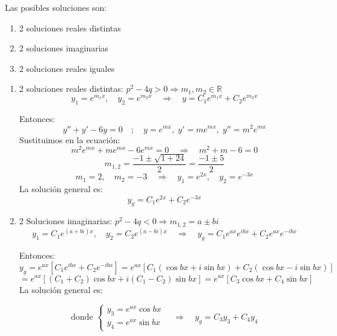 \documentclass[a4paper,12pt]{article}
\begin{document}
Las posibles soluciones son:

\begin{enumerate}[label=\textbf{\alph*)}]
    \item 2 soluciones reales distintas
    \item 2 soluciones imaginarias
    \item 2 soluciones reales iguales
\end{enumerate}

\begin{enumerate}[label=\textbf{\alph*)}]
\item 2 soluciones reales distintas: \quad \( p^2 - 4q > 0 \Rightarrow m_1, m_2 \in \mathbb{R} \)
\vspace{0,4 em}
\[
y_1 = e^{m_1 x}, \quad y_2 = e^{m_2 x}
\quad \Rightarrow \quad 
y = C_1 e^{m_1 x} + C_2 e^{m_2 x}
\]

Entonces:
\vspace{0,4 em}
\[
y'' + y' - 6y = 0 \quad ; \quad y = e^{mx}, \; y' = m e^{mx}, \; y'' = m^2 e^{mx}
\]
Sustituimos en la ecuación:
\vspace{0,4 em}
\[
m^2 e^{mx} + m e^{mx} - 6 e^{mx} = 0 
\quad \Rightarrow \quad 
m^2 + m - 6 = 0  
\]
\vspace{-0,2 em}
\[
m_{1,2} = \frac{-1 \pm \sqrt{1 + 24}}{2} = \frac{-1 \pm 5}{2}
\]
\vspace{-0,2 em}
\[
m_1 = 2, \quad m_2 = -3 
\quad \Rightarrow \quad 
y_1 = e^{2x}, \quad y_2 = e^{-3x}
\]
La solución general es:
\vspace{-0,2 em}
\[
y_g = C_1 e^{2x} + C_2 e^{-3x}
\]

\bigskip
\item 2 Soluciones imaginarias: \quad \( p^2 - 4q < 0 \Rightarrow m_{1,2} = a \pm bi \)
\vspace{0,4 em}
\[
y_1 = C_1 e^{(a + bi)x}, \quad y_2 = C_2 e^{(a - bi)x}
\quad \Rightarrow \quad 
y_g = C_1 e^{a x} e^{i b x} + C_2 e^{a x} e^{-i b x}
\]

Entonces:
\vspace{0,4 em}
\[
y_g = e^{a x} [ C_1 e^{i b x} + C_2 e^{-i b x} ] 
= e^{a x} [ C_1 (\cos bx + i \sin bx) + C_2 (\cos bx - i \sin bx) ]
\]
\vspace{-0,4 em}
\[
= e^{a x} [ (C_1 + C_2)\cos bx + i(C_1 - C_2)\sin bx ] 
= e^{a x} [ C_3 \cos bx + C_4 \sin bx ]
\]
La solución general es:

\[
\text{donde } 
\begin{cases}
y_3 = e^{a x}\cos bx \\
y_4 = e^{a x}\sin bx
\end{cases}
\quad \Rightarrow \quad
y_g = C_3 y_3 + C_4 y_4
\]
\end{enumerate}
\end{document}
